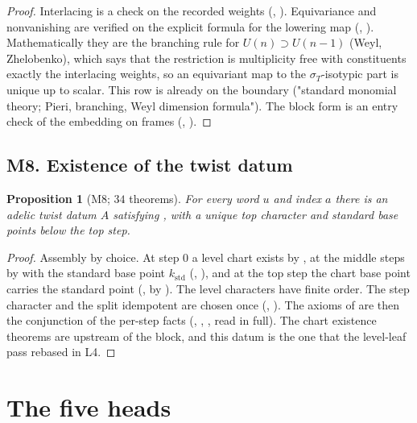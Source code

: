\documentclass[11pt]{article}
\newtheorem{proposition}[theorem]{Proposition}
\theoremstyle{remark}
\begin{document}
\begin{proof}
Interlacing is a check on the recorded weights (, ). Equivariance and nonvanishing are verified on the explicit formula for the lowering map (, ). Mathematically they are the branching rule for $U(n)\supset U(n-1)$ (Weyl, Zhelobenko), which says that the restriction is multiplicity free with constituents exactly the interlacing weights, so an equivariant map to the $\sigma_T$-isotypic part is unique up to scalar. This row is already on the boundary ("standard monomial theory; Pieri, branching, Weyl dimension formula"). The block form is an entry check of the embedding on frames (, ).
\end{proof}

\subsection{M8. Existence of the twist datum}

\begin{proposition}[M8; $34$ theorems]\label{prop:M8}
For every word $u$ and index $a$ there is an adelic twist datum $A$ satisfying , with a unique top character and standard base points below the top step.
\end{proposition}

\begin{proof}
Assembly by choice. At step $0$ a level chart exists by , at the middle steps by  with the standard base point $k_{\mathrm{std}}$ (, ), and at the top step the chart base point carries the standard point (, by ). The level characters have finite order. The step character and the split idempotent are chosen once (, ). The axioms of  are then the conjunction of the per-step facts (, , , read in full). The chart existence theorems are upstream of the block, and this datum is the one that the level-leaf pass rebased in L4.
\end{proof}

\section{The five heads}\label{sec:heads}
\end{document}
